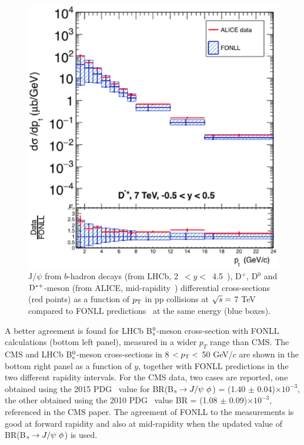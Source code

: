 \begin{figure}[!htbp]
\begin{center}
\includegraphics[width=.45\textwidth]{FigCap4/Dstar_7TeV_y_05_05.eps}
\caption{J/$\psi$ from $b$-hadron decays (from LHCb, \mbox{2 $< y <$ 4.5}~\cite{Aaij:2011jh}), D$^{+}$, D$^{0}$ and ${\rm D^{*+}}$-meson (from ALICE, mid-rapidity~\cite{ALICE:2011aa}) differential cross-sections (red points) as a function of $p_{\rm T}$ in pp collisions at $\sqrt{s} = $ 7 TeV compared to FONLL predictions~\cite{Cacciari:1998it, Cacciari:2001td} at the same energy (blue boxes). }
\label{fig:Dmesons}
\end{center}
\end{figure}
A better agreement is found for 
LHCb B$^0_{\rm s}$-meson cross-section with FONLL calculations (bottom left panel), measured in a wider 
$p_{T}$ range than CMS. The CMS and LHCb B$^0_{\rm s}$-meson cross-sections in 
8 $< p_{\rm T} <$ 50 GeV/$c$ are shown in 
the bottom right panel as a function of $y$, together with FONLL predictions in the 
two different rapidity intervals. For the CMS data, two cases are 
reported, one obtained using the 2015 PDG~\cite{Agashe:2014kda} value for 
BR(B$_{\rm s} \rightarrow J/{\rm \psi} ~\phi$) = (1.40 $\pm$ 0.04)$\times 10^{-3}$,
the other obtained using the 2010 PDG~\cite{Nakamura:2010zzi} value BR = (1.08 $\pm$ 0.09)$\times 10^{-3}$, 
referenced in the CMS paper. The agreement of FONLL to the measurements is good
at forward rapidity and also at mid-rapidity when the updated value of BR(B$_{\rm s} \rightarrow J/{\rm \psi} ~\phi$) is used.
